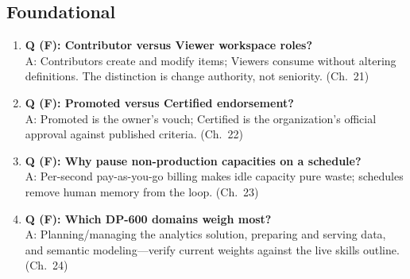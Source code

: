 \subsection*{Foundational}
\begin{enumerate}
    \item \textbf{Q (F): Contributor versus Viewer workspace roles?}\\
    A: Contributors create and modify items; Viewers consume without altering definitions. The
    distinction is change authority, not seniority. (Ch.~21)
    \item \textbf{Q (F): Promoted versus Certified endorsement?}\\
    A: Promoted is the owner's vouch; Certified is the organization's official approval against
    published criteria. (Ch.~22)
    \item \textbf{Q (F): Why pause non-production capacities on a schedule?}\\
    A: Per-second pay-as-you-go billing makes idle capacity pure waste; schedules remove human
    memory from the loop. (Ch.~23)
    \item \textbf{Q (F): Which DP-600 domains weigh most?}\\
    A: Planning/managing the analytics solution, preparing and serving data, and semantic
    modeling---verify current weights against the live skills outline. (Ch.~24)
\end{enumerate}

